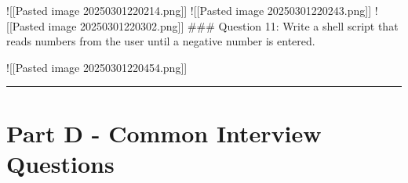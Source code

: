 !{[}{[}Pasted image 20250301220214.png{]}{]} !{[}{[}Pasted image
20250301220243.png{]}{]} !{[}{[}Pasted image 20250301220302.png{]}{]}
\#\#\# Question 11: Write a shell script that reads numbers from the
user until a negative number is entered.

\begin{Shaded}
\begin{Highlighting}[]
 \KeywordTok{;} 
       
     \BuiltInTok{[}  \BuiltInTok{]}\KeywordTok{;} 
      \OperatorTok{*} 
\end{Highlighting}
\end{Shaded}

!{[}{[}Pasted image 20250301220454.png{]}{]}

\begin{center}\rule{0.5\linewidth}{0.5pt}\end{center}

\section{Part D - Common Interview
Questions}\label{part-d---common-interview-questions}

